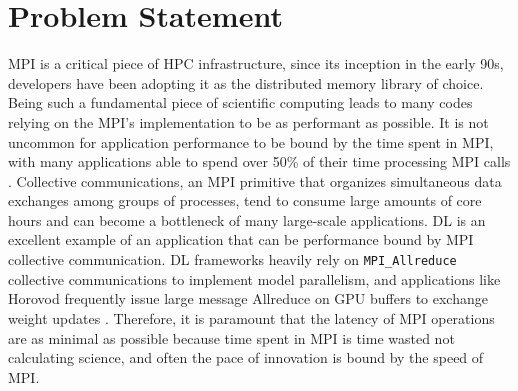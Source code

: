 \section{Problem Statement}
\gls{MPI} is a critical piece of \gls{HPC} infrastructure, since its inception in the early 90s, developers have been adopting it as the distributed memory library of choice.
Being such a fundamental piece of scientific computing leads to many codes relying on the \gls{MPI}'s implementation to be as performant as possible.  
It is not uncommon for application performance to be bound by the time spent in \gls{MPI}, with many applications able to spend over 50\% of their time processing \gls{MPI} calls \cite{Chunduri2018CharacterizeMPIonProd}.
Collective communications, an \gls{MPI} primitive that organizes simultaneous data exchanges among groups of processes, tend to consume large amounts of core hours and can become a bottleneck of many large-scale applications.
\gls{DL} is an excellent example of an application that can be performance bound by \gls{MPI} collective communication.
\gls{DL} frameworks heavily rely on \texttt{MPI\_Allreduce} collective communications to implement model parallelism, and applications like Horovod frequently issue large message Allreduce on \gls{GPU} buffers to exchange weight updates \cite{Awan2019CommProfDLonClusters, Jain2019PerfCharDNNTFPT, Alizadeh2022PAPCollDL}.
Therefore, it is paramount that the latency of \gls{MPI} operations are as minimal as possible because time spent in \gls{MPI} is time wasted not calculating science, and often the pace of innovation is bound by the speed of \gls{MPI}.

